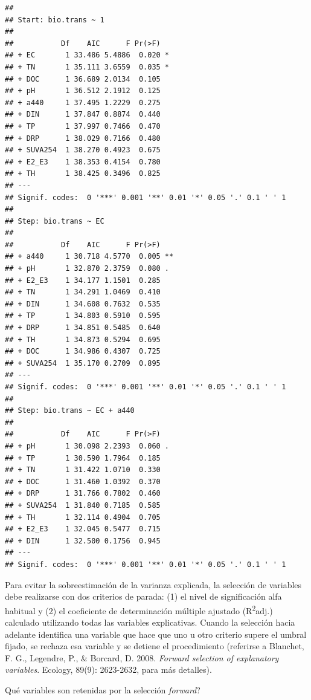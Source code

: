 \documentclass[
]{book}
\newenvironment{Shaded}{\begin{snugshade}}{\end{snugshade}}
\newcommand{\NormalTok}[1]{#1}
\newcommand{\SpecialCharTok}[1]{\textcolor[rgb]{0.00,0.00,0.00}{#1}}
\begin{document}
\begin{verbatim}
## 
## Start: bio.trans ~ 1 
## 
##           Df    AIC      F Pr(>F)  
## + EC       1 33.486 5.4886  0.020 *
## + TN       1 35.111 3.6559  0.035 *
## + DOC      1 36.689 2.0134  0.105  
## + pH       1 36.512 2.1912  0.125  
## + a440     1 37.495 1.2229  0.275  
## + DIN      1 37.847 0.8874  0.440  
## + TP       1 37.997 0.7466  0.470  
## + DRP      1 38.029 0.7166  0.480  
## + SUVA254  1 38.270 0.4923  0.675  
## + E2_E3    1 38.353 0.4154  0.780  
## + TH       1 38.425 0.3496  0.825  
## ---
## Signif. codes:  0 '***' 0.001 '**' 0.01 '*' 0.05 '.' 0.1 ' ' 1
## 
## Step: bio.trans ~ EC 
## 
##           Df    AIC      F Pr(>F)   
## + a440     1 30.718 4.5770  0.005 **
## + pH       1 32.870 2.3759  0.080 . 
## + E2_E3    1 34.177 1.1501  0.285   
## + TN       1 34.291 1.0469  0.410   
## + DIN      1 34.608 0.7632  0.535   
## + TP       1 34.803 0.5910  0.595   
## + DRP      1 34.851 0.5485  0.640   
## + TH       1 34.873 0.5294  0.695   
## + DOC      1 34.986 0.4307  0.725   
## + SUVA254  1 35.170 0.2709  0.895   
## ---
## Signif. codes:  0 '***' 0.001 '**' 0.01 '*' 0.05 '.' 0.1 ' ' 1
## 
## Step: bio.trans ~ EC + a440 
## 
##           Df    AIC      F Pr(>F)  
## + pH       1 30.098 2.2393  0.060 .
## + TP       1 30.590 1.7964  0.185  
## + TN       1 31.422 1.0710  0.330  
## + DOC      1 31.460 1.0392  0.370  
## + DRP      1 31.766 0.7802  0.460  
## + SUVA254  1 31.840 0.7185  0.585  
## + TH       1 32.114 0.4904  0.705  
## + E2_E3    1 32.045 0.5477  0.715  
## + DIN      1 32.500 0.1756  0.945  
## ---
## Signif. codes:  0 '***' 0.001 '**' 0.01 '*' 0.05 '.' 0.1 ' ' 1
\end{verbatim}

Para evitar la sobreestimación de la varianza explicada, la selección de variables debe realizarse con dos criterios de parada: (1) el nivel de significación alfa habitual y (2) el coeficiente de determinación múltiple ajustado (R\textsuperscript{2}adj.) calculado utilizando todas las variables explicativas. Cuando la selección hacia adelante identifica una variable que hace que uno u otro criterio supere el umbral fijado, se rechaza esa variable y se detiene el procedimiento (referirse a Blanchet, F. G., Legendre, P., \& Borcard, D. 2008. \emph{Forward selection of explanatory variables}. Ecology, 89(9): 2623-2632, para más detalles).

Qué variables son retenidas por la selección \emph{forward}?

\begin{Shaded}
\end{Shaded}
\end{document}
